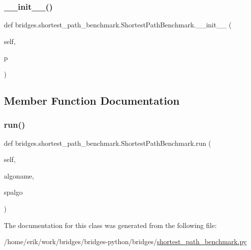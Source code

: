 \subsubsection{\texorpdfstring{\+\_\+\+\_\+init\+\_\+\+\_\+()}{\_\_init\_\_()}}
{\footnotesize\ttfamily def bridges.\+shortest\+\_\+path\+\_\+benchmark.\+Shortest\+Path\+Benchmark.\+\_\+\+\_\+init\+\_\+\+\_\+ (\begin{DoxyParamCaption}\item[{}]{self,  }\item[{}]{p }\end{DoxyParamCaption})}



\subsection{Member Function Documentation}
\mbox{\label{classbridges_1_1shortest__path__benchmark_1_1_shortest_path_benchmark_aba41366eff6ee3281ba4decd8d57b089}} 
\subsubsection{\texorpdfstring{run()}{run()}}
{\footnotesize\ttfamily def bridges.\+shortest\+\_\+path\+\_\+benchmark.\+Shortest\+Path\+Benchmark.\+run (\begin{DoxyParamCaption}\item[{}]{self,  }\item[{}]{algoname,  }\item[{}]{spalgo }\end{DoxyParamCaption})}



The documentation for this class was generated from the following file\+:\begin{DoxyCompactItemize}
\item 
/home/erik/work/bridges/bridges-\/python/bridges/\hyperlink{shortest__path__benchmark_8py}{shortest\+\_\+path\+\_\+benchmark.\+py}\end{DoxyCompactItemize}
